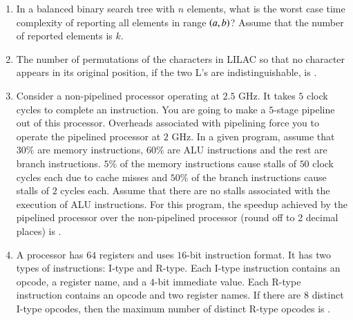 \documentclass[journal,12pt,onecolumn]{IEEEtran}
\theoremstyle{remark}
\begin{document}
\begin{enumerate}
\item In a balanced binary search tree with $n$ elements, what is the worst case time complexity of reporting all elements in range $\left(a, b\right)$? Assume that the number of reported elements is $k$.  

\hfill{}

\begin{enumerate}
	\begin{multicols}{4}
		\item $\Theta(\log n)$
		\item $\Theta(\log n + k)$
		\item $\Theta(\log n + \log k)$
		\item $\Theta(n \log k)$
	\end{multicols}
\end{enumerate}

\item The number of permutations of the characters in LILAC so that no character appears in its original position, if the two L’s are indistinguishable, is \underline{\hspace{2cm}}.  

\hfill{}

\item Consider a non-pipelined processor operating at $2.5$ GHz. It takes $5$ clock cycles to complete an instruction. You are going to make a $5$-stage pipeline out of this processor. Overheads associated with pipelining force you to operate the pipelined processor at $2$ GHz. In a given program, assume that $30\%$ are memory instructions, $60\%$ are ALU instructions and the rest are branch instructions. $5\%$ of the memory instructions cause stalls of $50$ clock cycles each due to cache misses and $50\%$ of the branch instructions cause stalls of $2$ cycles each. Assume that there are no stalls associated with the execution of ALU instructions. For this program, the speedup achieved by the pipelined processor over the non-pipelined processor (round off to 2 decimal places) is \underline{\hspace{2cm}}.  

\hfill{}

\item A processor has $64$ registers and uses $16$-bit instruction format. It has two types of instructions: I-type and R-type. Each I-type instruction contains an opcode, a register name, and a $4$-bit immediate value. Each R-type instruction contains an opcode and two register names. If there are $8$ distinct I-type opcodes, then the maximum number of distinct R-type opcodes is \underline{\hspace{2cm}}.  


\end{enumerate}
\end{document}

